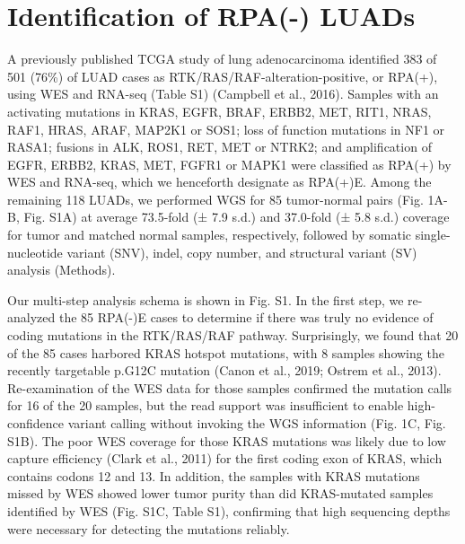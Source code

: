\documentclass[phd,tocprelim]{cornell}
\begin{document}
\section{Identification of RPA(-) LUADs}
A previously published TCGA study of lung adenocarcinoma identified 383 of 501 (76\%) of LUAD cases as RTK/RAS/RAF-alteration-positive, or RPA(+), using WES and RNA-seq (Table S1) (Campbell et al., 2016). Samples with an activating mutations in KRAS, EGFR, BRAF, ERBB2, MET, RIT1, NRAS, RAF1, HRAS, ARAF, MAP2K1 or SOS1; loss of function mutations in NF1 or RASA1; fusions in ALK, ROS1, RET, MET or NTRK2; and amplification of EGFR, ERBB2, KRAS, MET, FGFR1 or MAPK1 were classified as RPA(+) by WES and RNA-seq, which we henceforth designate as RPA(+)E. Among the remaining 118 LUADs, we performed WGS for 85 tumor-normal pairs (Fig. 1A-B, Fig. S1A) at average 73.5-fold (± 7.9 s.d.) and 37.0-fold (± 5.8 s.d.) coverage for tumor and matched normal samples, respectively, followed by somatic single-nucleotide variant (SNV), indel, copy number, and structural variant (SV) analysis (Methods).  

Our multi-step analysis schema is shown in Fig. S1. In the first step, we re-analyzed the 85 RPA(-)E cases to determine if there was truly no evidence of coding mutations in the RTK/RAS/RAF pathway. Surprisingly, we found that 20 of the 85 cases harbored KRAS hotspot mutations, with 8 samples showing the recently targetable p.G12C mutation (Canon et al., 2019; Ostrem et al., 2013). Re-examination of the WES data for those samples confirmed the mutation calls for 16 of the 20 samples, but the read support was insufficient to enable high-confidence variant calling without invoking the WGS information (Fig. 1C, Fig. S1B). The poor WES coverage for those KRAS mutations was likely due to low capture efficiency (Clark et al., 2011) for the first coding exon of KRAS, which contains codons 12 and 13. In addition, the samples with KRAS mutations missed by WES showed lower tumor purity than did KRAS-mutated samples identified by WES (Fig. S1C, Table S1), confirming that high sequencing depths were necessary for detecting the mutations reliably.
\end{document}
